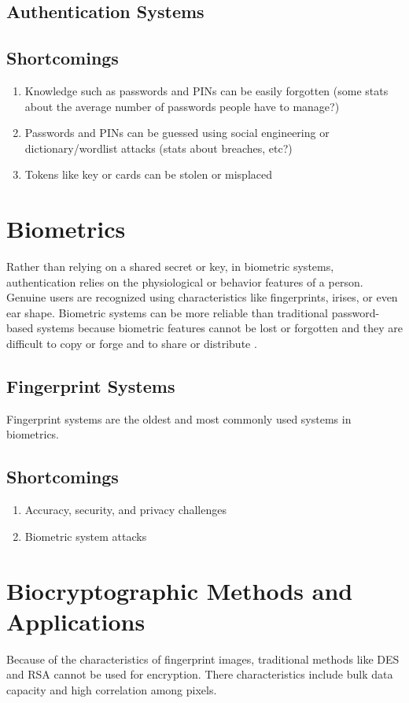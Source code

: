 \documentclass[11pt]{article}
\begin{document}
    \subsection{Authentication Systems}
    \subsection{Shortcomings}
        \begin{enumerate}[1.]
        \item Knowledge such as passwords and PINs can be easily forgotten (some stats about the average number of passwords people have to manage?)
        \item Passwords and PINs can be guessed using social engineering or dictionary/wordlist attacks (stats about breaches, etc?)
        \item Tokens like key or cards can be stolen or misplaced
        \end{enumerate}
\section{Biometrics}
Rather than relying on a shared secret or key, in biometric systems, 
authentication relies on the physiological or behavior features of a person. 
Genuine users are recognized using characteristics like fingerprints,
irises, or even ear shape. Biometric systems can be more reliable than traditional
password-based systems because biometric features cannot be lost or forgotten
and they are difficult to copy or forge and to share or distribute \cite{Fingerprint07}. 
\subsection{Fingerprint Systems}
Fingerprint systems are the oldest and most commonly used systems in biometrics.
\subsection{Shortcomings}
        \begin{enumerate}[1.]
        \item Accuracy, security, and privacy challenges
        \item Biometric system attacks
        \end{enumerate}
\section{Biocryptographic Methods and Applications}
Because of the characteristics of fingerprint images, traditional methods like 
DES and RSA cannot be used for encryption. There characteristics include 
bulk data capacity and high correlation among pixels.
\end{document}
